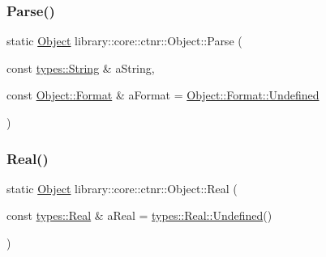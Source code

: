 \mbox{\label{classlibrary_1_1core_1_1ctnr_1_1Object_a31cb8fb2efb90be411044247b64fe854}} 
\subsubsection{\texorpdfstring{Parse()}{Parse()}}
{\footnotesize\ttfamily static \hyperlink{classlibrary_1_1core_1_1ctnr_1_1Object}{Object} library\+::core\+::ctnr\+::\+Object\+::\+Parse (\begin{DoxyParamCaption}\item[{const \hyperlink{classlibrary_1_1core_1_1types_1_1String}{types\+::\+String} \&}]{a\+String,  }\item[{const \hyperlink{classlibrary_1_1core_1_1ctnr_1_1Object_a7bf8961c4ef65f691aa2993ec405c647}{Object\+::\+Format} \&}]{a\+Format = {\ttfamily \hyperlink{classlibrary_1_1core_1_1ctnr_1_1Object_a7bf8961c4ef65f691aa2993ec405c647aec0fc0100c4fc1ce4eea230c3dc10360}{Object\+::\+Format\+::\+Undefined}} }\end{DoxyParamCaption})\hspace{0.3cm}{\ttfamily [static]}}

\mbox{\label{classlibrary_1_1core_1_1ctnr_1_1Object_ab3928ff53382f2f07b2c8e148d764136}} 
\subsubsection{\texorpdfstring{Real()}{Real()}}
{\footnotesize\ttfamily static \hyperlink{classlibrary_1_1core_1_1ctnr_1_1Object}{Object} library\+::core\+::ctnr\+::\+Object\+::\+Real (\begin{DoxyParamCaption}\item[{const \hyperlink{classlibrary_1_1core_1_1types_1_1Real}{types\+::\+Real} \&}]{a\+Real = {\ttfamily \hyperlink{classlibrary_1_1core_1_1types_1_1Real_a67778e3d4c5a5b6ca6ddcd47964b9a79}{types\+::\+Real\+::\+Undefined}()} }\end{DoxyParamCaption})\hspace{0.3cm}{\ttfamily [static]}}

